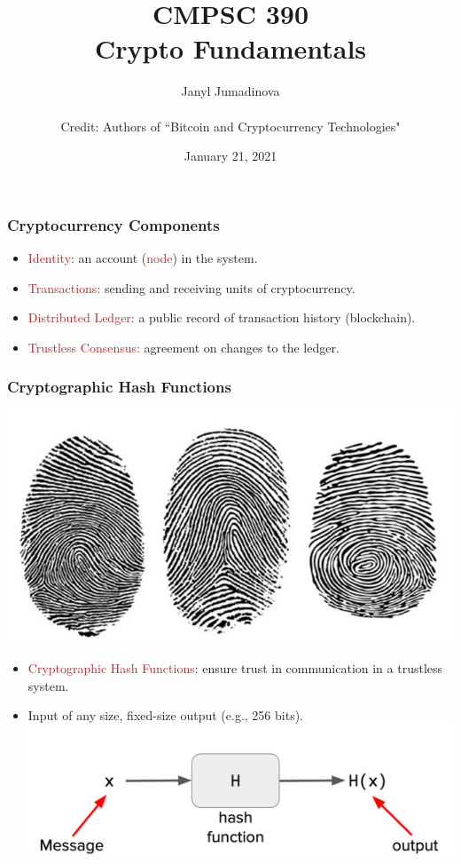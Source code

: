 \documentclass{beamer}
\title{CMPSC 390 \\ Crypto Fundamentals }
\author{Janyl Jumadinova \\ $ $ \\ Credit: Authors of ``Bitcoin and Cryptocurrency Technologies"}
\date{January 21, 2021}
\begin{document}
\begin{frame}
  \titlepage
\end{frame}

\begin{frame}
  \frametitle{Cryptocurrency Components}
	\begin{itemize}
		\item \textcolor{brown}{Identity}:  an account (\textcolor{brown}{node}) in the system.
		\item \textcolor{brown}{Transactions:} sending and receiving  units of cryptocurrency.
		\item \textcolor{brown}{Distributed Ledger:} a public record of transaction history (blockchain).
		\item \textcolor{brown}{Trustless Consensus:} agreement on changes to the ledger.
	\end{itemize}
\end{frame}
\begin{frame}
  \frametitle{Cryptographic Hash Functions}
  
	\includegraphics[scale=0.3]{fingers}
	\begin{itemize}
		\item \textcolor{brown}{Cryptographic Hash Functions}:  ensure trust in communication in a trustless system. \pause
		\item Input of any size, fixed-size output (e.g., 256 bits).
	\includegraphics[scale=0.5]{hash}
	\end{itemize}
\end{frame}
\end{document}
